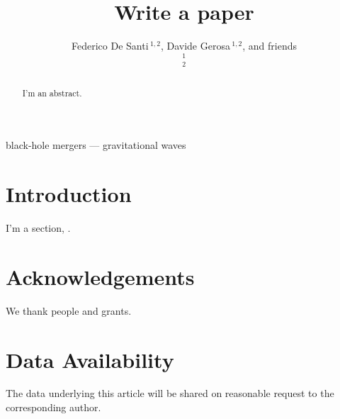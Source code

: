 \documentclass[fleqn,usenatbib]{mnras_tex_edited}
\title[Write a paper]{Write a paper}
\author[De Santi et al.]{Federico De Santi$\,$\orcidlink{0009-0000-2445-5729}$^{1,2}$, Davide Gerosa$\,$\orcidlink{0009-0000-2445-5729}$^{1,2}$, and friends
\medskip
\\
$^{1}$\milan\\
$^{2}$\infn\\
}
\begin{document}
\label{firstpage}
\pagerange{\pageref{firstpage}--\pageref{lastpage}}
\maketitle

\begin{abstract}

I'm an abstract.

\end{abstract}

\begin{keywords}
black-hole mergers --- gravitational waves
\end{keywords}


\section{Introduction}

I'm a section, \cite{2016PhRvL.116f1102A}.

\section*{Acknowledgements}

We thank people and grants.


\section*{Data Availability}
The data underlying this article will be shared on reasonable request to the corresponding author.



 
\end{document}
